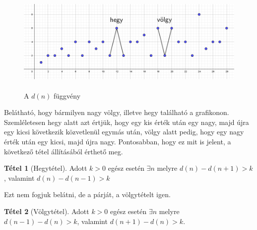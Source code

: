 \documentclass[12pt]{book}
\theoremstyle{plain} %
\theoremstyle{definition} %
\newtheorem{theo/}{Tétel}[section]
\newenvironment{theo}
  {\renewcommand{\qedsymbol}{$\clubsuit$}%
   \pushQED{\qed}\begin{theo/}}
  {\popQED\end{theo/}}
\theoremstyle{remark}
\renewcommand\qedsymbol{$\blacksquare$}
\numberwithin{equation}{section}  %
\begin{document}
	\begin{figure}[h] %
		\centering
		\includegraphics[height=5cm]{d(n).png}
		\caption{A $d(n)$ függvény}\label{d(n)}
	\end{figure}

	Belátható, hogy bármilyen nagy völgy, illetve hegy található a grafikonon. Szemléletesen hegy alatt azt értjük, hogy egy kis érték után egy nagy, majd újra egy kicsi következik közvetlenül egymás után, völgy alatt pedig, hogy egy nagy érték után egy kicsi, majd újra nagy. Pontosabban, hogy ez mit is jelent, a következő tétel állításából érthető meg.
	
	\begin{theo}[Hegytétel]
		Adott $k>0$ egész esetén $\exists n$ melyre $d(n)-d(n+1) > k$, valamint $d(n)-d(n-1)>k$
	\end{theo}

	Ezt nem fogjuk belátni, de a párját, a völgytételt igen.
	
	\begin{theo}[Völgytétel]
		Adott $k>0$ egész esetén $\exists n$ melyre $d(n-1)-d(n)>k$, valamint $d(n+1)-d(n)>k$.
	\end{theo}
\end{document}
